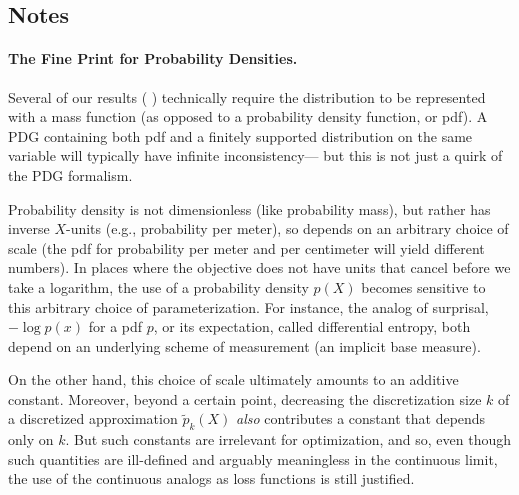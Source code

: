 \clearpage
\begin{subappendices}

\section{Notes}
\paragraph{The Fine Print for Probability Densities.}
\label{appendix:density}
Several of our results (%
)
technically require the distribution to be represented with a mass function (as opposed to a probability density function, or pdf).
A PDG containing both pdf and a finitely supported distribution on the same variable
will typically have infinite inconsistency---%
but this is not just a quirk of the PDG formalism.


Probability density is not dimensionless (like probability mass), but rather has inverse $X$-units (e.g., probability per meter), so depends on an arbitrary choice of scale (the pdf for probability per meter and per centimeter will yield different numbers).
In places where the objective does not have units that cancel before we take a logarithm,
the use of a probability density $p(X)$ becomes sensitive to this arbitrary choice of parameterization. For instance, the analog of surprisal, $- \log p(x)$ for a pdf $p$, or its expectation, called differential entropy, both depend on an underlying scheme of measurement (an implicit base measure).

On the other hand, this choice of scale ultimately amounts to an additive constant.
Moreover, beyond a certain point, decreasing the discretization size $k$ of a discretized approximation $\tilde p_k(X)$ \emph{also} contributes a constant that depends only on $k$.
But such constants are irrelevant for optimization, and so, even though such quantities are ill-defined and arguably meaningless in the continuous limit, the use of the continuous analogs as loss functions is still justified.


\end{subappendices}
